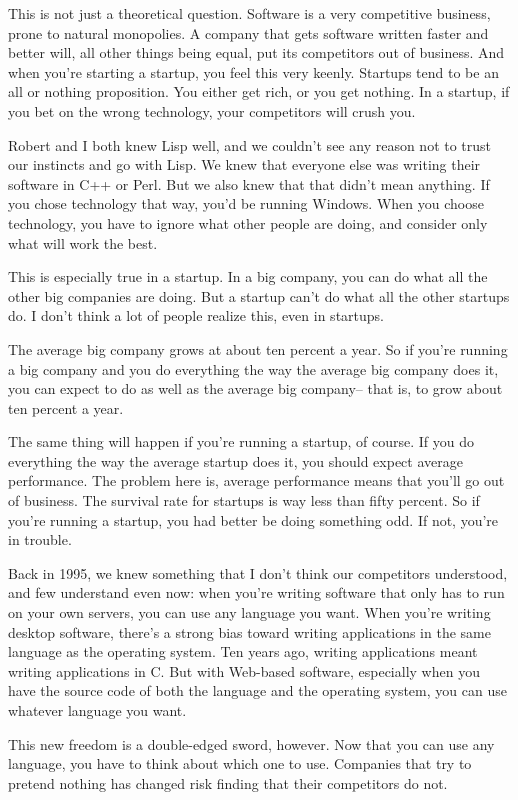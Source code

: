 \documentclass[10pt,twoside,openright]{memoir}
\begin{document}
This is not just a theoretical question. Software is a very competitive business, prone to natural monopolies. A company that gets software written faster and better will, all other things being equal, put its competitors out of business. And when you're starting a startup, you feel this very keenly. Startups tend to be an all or nothing proposition. You either get rich, or you get nothing. In a startup, if you bet on the wrong technology, your competitors will crush you.

Robert and I both knew Lisp well, and we couldn't see any reason not to trust our instincts and go with Lisp. We knew that everyone else was writing their software in C++ or Perl. But we also knew that that didn't mean anything. If you chose technology that way, you'd be running Windows. When you choose technology, you have to ignore what other people are doing, and consider only what will work the best.

This is especially true in a startup. In a big company, you can do what all the other big companies are doing. But a startup can't do what all the other startups do. I don't think a lot of people realize this, even in startups.

The average big company grows at about ten percent a year. So if you're running a big company and you do everything the way the average big company does it, you can expect to do as well as the average big company-- that is, to grow about ten percent a year.

The same thing will happen if you're running a startup, of course. If you do everything the way the average startup does it, you should expect average performance. The problem here is, average performance means that you'll go out of business. The survival rate for startups is way less than fifty percent. So if you're running a startup, you had better be doing something odd. If not, you're in trouble.

Back in 1995, we knew something that I don't think our competitors understood, and few understand even now: when you're writing software that only has to run on your own servers, you can use any language you want. When you're writing desktop software, there's a strong bias toward writing applications in the same language as the operating system. Ten years ago, writing applications meant writing applications in C. But with Web-based software, especially when you have the source code of both the language and the operating system, you can use whatever language you want.

This new freedom is a double-edged sword, however. Now that you can use any language, you have to think about which one to use. Companies that try to pretend nothing has changed risk finding that their competitors do not.
\end{document}
